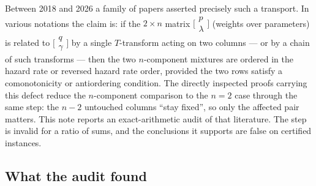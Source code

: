 \documentclass[10pt]{article}
\theoremstyle{plain}
\theoremstyle{definition}
\theoremstyle{remark}
\begin{document}
Between 2018 and 2026 a family of papers asserted precisely such a transport. In various notations the claim is: if the $2\times n$ matrix $\bigl[\begin{smallmatrix}p\\ \lambda\end{smallmatrix}\bigr]$ (weights over parameters) is related to $\bigl[\begin{smallmatrix}q\\ \gamma\end{smallmatrix}\bigr]$ by a single $T$-transform acting on two columns --- or by a chain of such transforms --- then the two $n$-component mixtures are ordered in the hazard rate or reversed hazard rate order, provided the two rows satisfy a comonotonicity or antiordering condition. The directly inspected proofs carrying this defect reduce the $n$-component comparison to the $n=2$ case through the same step: the $n-2$ untouched columns ``stay fixed'', so only the affected pair matters. This note reports an exact-arithmetic audit of that literature. The step is invalid for a ratio of sums, and the conclusions it supports are false on certified instances.

\subsection*{What the audit found}
\end{document}
